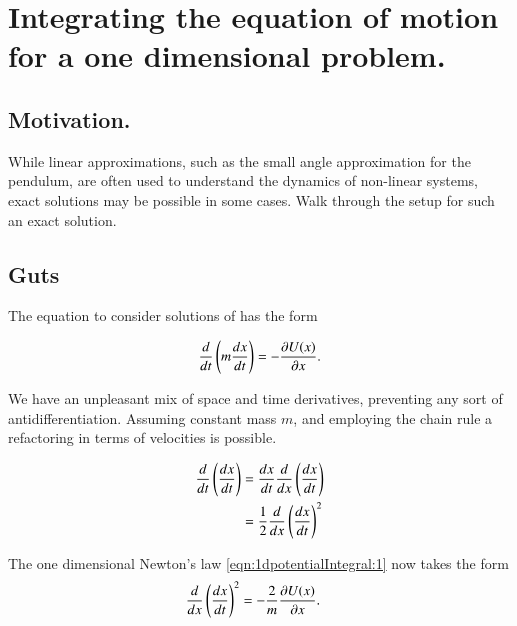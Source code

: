 %

\chapter{Integrating the equation of motion for a one dimensional problem.}
\label{chap:1dpotentialIntegral}
{}
\date{Jan 1, 2010}

\beginArtNoToc

\section{Motivation.}

While linear approximations, such as the small angle approximation for the pendulum, are often used to understand the dynamics of non-linear systems, exact solutions may be possible in some cases.  Walk through the setup for such an exact solution.

\section{Guts}

The equation to consider solutions of has the form

\begin{align}
\label{eqn:1dpotentialIntegral:1}
\frac{d}{dt} \left( m \frac{dx}{dt} \right) = -\PD{x}{U(x)}.
\end{align}

We have an unpleasant mix of space and time derivatives, preventing any sort of antidifferentiation.  Assuming constant mass $m$, and employing the chain rule a refactoring in terms of velocities is possible.

\begin{align*}
\frac{d}{dt} \left( \frac{dx}{dt} \right) 
&= 
\frac{dx}{dt} \frac{d}{dx} \left( \frac{dx}{dt} \right)  \\
&= 
\frac{1}{2} \frac{d}{dx} \left( \frac{dx}{dt} \right)^2  \\
\end{align*}

The one dimensional Newton's law \autoref{eqn:1dpotentialIntegral:1} now takes the form
\begin{align}
\label{eqn:1dpotentialIntegral:2}
\frac{d}{dx} \left( \frac{dx}{dt} \right)^2 &= -\frac{2}{m} \PD{x}{U(x)}.
\end{align}

